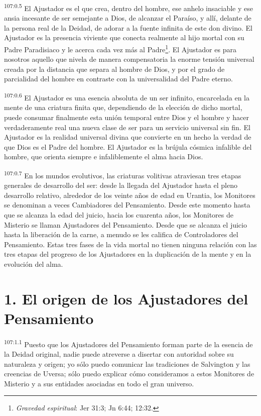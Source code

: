 \documentclass[twoside, 11pt]{book}
\begin{document}
\par
\textsuperscript{107:0.5} El Ajustador es el que crea, dentro del hombre, ese anhelo insaciable y ese ansia incesante de ser semejante a Dios, de alcanzar el Paraíso, y allí, delante de la persona real de la Deidad, de adorar a la fuente infinita de este don divino. El Ajustador es la presencia viviente que conecta realmente al hijo mortal con su Padre Paradisiaco y le acerca cada vez más al Padre\footnote{\textit{Gravedad espiritual}: Jer 31:3; Jn 6:44; 12:32.}. El Ajustador es para nosotros aquello que nivela de manera compensatoria la enorme tensión universal creada por la distancia que separa al hombre de Dios, y por el grado de parcialidad del hombre en contraste con la universalidad del Padre eterno.

\par
\textsuperscript{107:0.6} El Ajustador es una esencia absoluta de un ser infinito, encarcelada en la mente de una criatura finita que, dependiendo de la elección de dicho mortal, puede consumar finalmente esta unión temporal entre Dios y el hombre y hacer verdaderamente real una nueva clase de ser para un servicio universal sin fin. El Ajustador es la realidad universal divina que convierte en un hecho la verdad de que Dios es el Padre del hombre. El Ajustador es la brújula cósmica infalible del hombre, que orienta siempre e infaliblemente el alma hacia Dios.

\par
\textsuperscript{107:0.7} En los mundos evolutivos, las criaturas volitivas atraviesan tres etapas generales de desarrollo del ser: desde la llegada del Ajustador hasta el pleno desarrollo relativo, alrededor de los veinte años de edad en Urantia, los Monitores se denominan a veces Cambiadores del Pensamiento. Desde este momento hasta que se alcanza la edad del juicio, hacia los cuarenta años, los Monitores de Misterio se llaman Ajustadores del Pensamiento. Desde que se alcanza el juicio hasta la liberación de la carne, a menudo se les califica de Controladores del Pensamiento. Estas tres fases de la vida mortal no tienen ninguna relación con las tres etapas del progreso de los Ajustadores en la duplicación de la mente y en la evolución del alma.

\section*{1. El origen de los Ajustadores del Pensamiento}
\par
\textsuperscript{107:1.1} Puesto que los Ajustadores del Pensamiento forman parte de la esencia de la Deidad original, nadie puede atreverse a disertar con autoridad sobre su naturaleza y origen; yo sólo puedo comunicar las tradiciones de Salvington y las creencias de Uversa; sólo puedo explicar cómo consideramos a estos Monitores de Misterio y a sus entidades asociadas en todo el gran universo.
\end{document}
